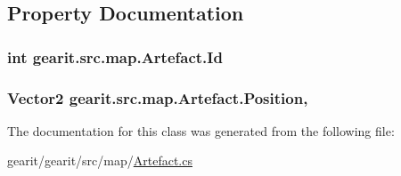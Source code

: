 \subsection{Property Documentation}
\hypertarget{classgearit_1_1src_1_1map_1_1_artefact_a47218e1d5629a09d6f9ee094b362fe05}{
\subsubsection[{Id}]{\setlength{\rightskip}{0pt plus 5cm}int gearit.\+src.\+map.\+Artefact.\+Id\hspace{0.3cm}{\ttfamily [get]}}}\label{classgearit_1_1src_1_1map_1_1_artefact_a47218e1d5629a09d6f9ee094b362fe05}
\hypertarget{classgearit_1_1src_1_1map_1_1_artefact_ad00862e22dc51f3ddeefa1fd2b2ba124}{
\subsubsection[{Position}]{\setlength{\rightskip}{0pt plus 5cm}Vector2 gearit.\+src.\+map.\+Artefact.\+Position\hspace{0.3cm}{\ttfamily [get]}, {\ttfamily [set]}}}\label{classgearit_1_1src_1_1map_1_1_artefact_ad00862e22dc51f3ddeefa1fd2b2ba124}


The documentation for this class was generated from the following file\+:\begin{DoxyCompactItemize}
\item 
gearit/gearit/src/map/\hyperlink{_artefact_8cs}{Artefact.\+cs}\end{DoxyCompactItemize}
